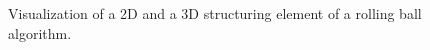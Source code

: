 \begin{figure}[H]
    \centering
    \qquad
    \caption{Visualization of a 2D and a 3D structuring element of a rolling ball algorithm.}
    \label{fig:rolling-ball}
\end{figure}